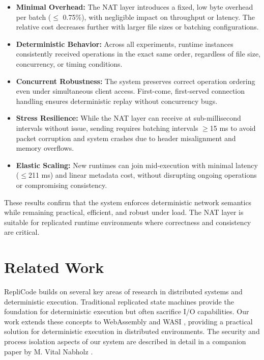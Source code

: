 \documentclass[10pt]{IEEEtran}
\begin{document}
\begin{itemize}
    \item \textbf{Minimal Overhead:} The NAT layer introduces a fixed, low byte overhead per batch ($\leq$ 0.75\%), with negligible impact on throughput or latency. The relative cost decreases further with larger file sizes or batching configurations.
    
    \item \textbf{Deterministic Behavior:} Across all experiments, runtime instances consistently received operations in the exact same order, regardless of file size, concurrency, or timing conditions.
    
    \item \textbf{Concurrent Robustness:} The system preserves correct operation ordering even under simultaneous client access. First-come, first-served connection handling ensures deterministic replay without concurrency bugs.
    
    \item \textbf{Stress Resilience:} While the NAT layer can receive at sub-millisecond intervals without issue, sending requires batching intervals $\geq$15 ms to avoid packet corruption and system crashes due to header misalignment and memory overflows.
    
    \item \textbf{Elastic Scaling:} New runtimes can join mid-execution with minimal latency ($\leq$211 ms) and linear metadata cost, without disrupting ongoing operations or compromising consistency.
\end{itemize}

These results confirm that the system enforces deterministic network semantics while remaining practical, efficient, and robust under load. The NAT layer is suitable for replicated runtime environments where correctness and consistency are critical.

\section{Related Work}
RepliCode builds on several key areas of research in distributed systems and deterministic execution. Traditional replicated state machines \cite{deterministic2010} provide the foundation for deterministic execution but often sacrifice I/O capabilities. Our work extends these concepts to WebAssembly \cite{wasm2017} and WASI \cite{wasi2023}, providing a practical solution for deterministic execution in distributed environments. The security and process isolation aspects of our system are described in detail in a companion paper by M. Vital Nabholz \cite{replicode2025}.
\end{document}
